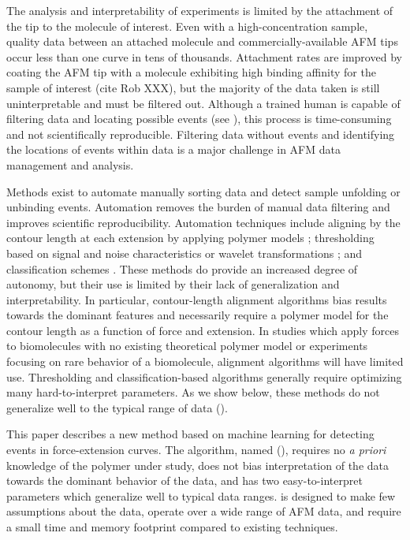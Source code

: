 The analysis and interpretability of \singlemol{} experiments is limited by the attachment of the tip to the molecule of interest. Even with a high-concentration sample, quality \singlemol{} data between an attached molecule and commercially-available AFM tips occur less than one curve in tens of thousands\cite{bosshart_reference-free_2012}. Attachment rates are improved by coating the AFM tip with a molecule exhibiting high binding affinity for the sample of interest (cite Rob XXX), but the majority of the data taken is still uninterpretable and must be filtered out. Although a trained human is capable of filtering \singlemol{} data and locating possible events (see ), this process is time-consuming and not scientifically reproducible. Filtering data without events and identifying the locations of events within data is a major challenge in AFM data management and analysis.\pl

Methods exist to automate manually sorting \singlemol{} data and detect sample unfolding or unbinding events. Automation removes the burden of manual data filtering and improves scientific reproducibility. Automation techniques include aligning by the contour length at each extension by applying polymer models \cite{kuhn_automated_2005,bosshart_reference-free_2012}; thresholding based on signal and noise characteristics \cite{gergely_semi-automatized_2001,roduit_openfovea:_2012} or wavelet transformations \cite{garcia-masso_automated_2016,benitez_searching_2017}; and classification schemes \cite{kasas_fuzzy_2000}. These methods do provide an increased degree of autonomy, but their use is limited by their lack of generalization and interpretability. In particular, contour-length alignment algorithms bias results towards the dominant features and necessarily require a polymer model for the contour length as a function of force and extension. In \singlemol{} studies which apply forces to biomolecules with no existing theoretical polymer model or experiments focusing on rare behavior of a biomolecule, alignment algorithms will have limited use.  Thresholding and classification-based algorithms generally require optimizing many hard-to-interpret parameters. As we show below, these methods do not generalize well to the typical range of \singlemol{} data ().\pl

This paper describes a new method based on machine learning for detecting events in \singlemol{} force-extension curves.  The algorithm, named \name{} (\acronym{}), requires no \emph{a priori} knowledge of the polymer under study, does not bias interpretation of the data towards the dominant behavior of the data, and has two easy-to-interpret parameters which generalize well to typical \singlemol{} data ranges. \name{} is designed to make few assumptions about the data, operate over a wide range of AFM data, and require a small time and memory footprint compared to existing techniques.\pl

